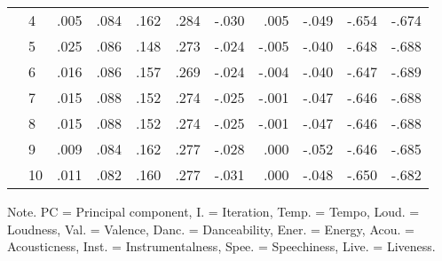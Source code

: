 \begin{table}[ht]
\begin{threeparttable}
\begin{tabular*}{\textwidth}{@{\extracolsep{\fill}}llrrrrrrrrr@{}}
   & 4         & .005  & .084     & .162    & .284   & -.030  & .005    & -.049   & -.654   & -.674    \\
   & 5         & .025  & .086     & .148    & .273   & -.024  & -.005   & -.040   & -.648   & -.688    \\
   & 6         & .016  & .086     & .157    & .269   & -.024  & -.004   & -.040   & -.647   & -.689    \\
   & 7         & .015  & .088     & .152    & .274   & -.025  & -.001   & -.047   & -.646   & -.688    \\
   & 8         & .015  & .088     & .152    & .274   & -.025  & -.001   & -.047   & -.646   & -.688    \\
   & 9         & .009  & .084     & .162    & .277   & -.028  & .000    & -.052   & -.646   & -.685    \\
   & 10        & .011  & .082     & .160    & .277   & -.031  & .000    & -.048   & -.650   & -.682    \\
\bottomrule

\end{tabular*}
\begin{tablenotes}
\small
\item Note. PC = Principal component, I. = Iteration, Temp. = Tempo, Loud. = Loudness, Val. = Valence, Danc. = Danceability, Ener. = Energy, Acou. = Acousticness, Inst. = Instrumentalness, Spee. = Speechiness, Live. = Liveness.
\end{tablenotes}
\end{threeparttable}
\end{table}